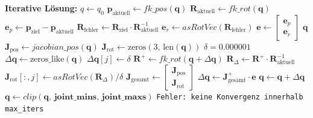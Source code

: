 \begin{algorithm}[H]
\begin{algorithmic}[1]
        \Statex
        \State \textbf{Iterative Lösung:}
        \State $q \gets q_0$ 
            \State $\mathbf{p}_{\text{aktuell}} \gets \mathit{fk\_pos}(\mathbf{q})$
            \State $\mathbf{R}_{\text{aktuell}} \gets \mathit{fk\_rot}(\mathbf{q})$
            \State $\mathbf{e}_p \gets \mathbf{p}_{\text{ziel}} - \mathbf{p}_{\text{aktuell}}$
            \State $\mathbf{R}_{\text{fehler}} \gets \mathbf{R}_{\text{ziel}} \cdot \mathbf{R}_{\text{aktuell}}^{-1}$
            \State $\mathbf{e}_r \gets \mathit{asRotVec}(\mathbf{R}_{\text{fehler}})$
            \State $\mathbf{e} \gets \begin{bmatrix} \mathbf{e}_p \\ \mathbf{e}_r \end{bmatrix}$ 
                \State \Return $\mathbf{q}$
            \EndIf
            \State $\mathbf{J}_{\text{pos}} \gets \mathit{jacobian\_pos}(\mathbf{q})$
            \State $\mathbf{J}_{\text{rot}} \gets \text{zeros}(3,\, \text{len}(\mathbf{q}))$
            \State $\delta = 0.000001$
                \State $\Delta\mathbf{q} \gets \text{zeros\_like}(\mathbf{q})$
                \State $\Delta\mathbf{q}[j] \gets \delta$
                \State $\mathbf{R}^+ \gets \mathit{fk\_rot}(\mathbf{q} + \Delta\mathbf{q})$
                \State $\mathbf{R}_{\Delta} \gets \mathbf{R}^+ \cdot \mathbf{R}_{\text{aktuell}}^{-1}$
                \State $\mathbf{J}_{\text{rot}}[:, j] \gets \mathit{asRotVec}(\mathbf{R}_{\Delta}) / \delta$
            \EndFor
            \State $\mathbf{J}_{\text{gesamt}} \gets \begin{bmatrix} \mathbf{J}_{\text{pos}} \\ \mathbf{J}_{\text{rot}} \end{bmatrix}$
            \State $\Delta\mathbf{q} \gets \mathbf{J}_{\text{gesamt}}^{+} \cdot \mathbf{e}$
            \State $\mathbf{q} \gets \mathbf{q} + \Delta\mathbf{q}$
                \State $\mathbf{q} \gets \mathit{clip}(\mathbf{q},\, \mathbf{joint\_mins},\, \mathbf{joint\_maxs})$
            \EndIf
        \EndFor
        \State \Return \texttt{Fehler: keine Konvergenz innerhalb max\_iters}
    \end{algorithmic}
\end{algorithm}
\vspace{1em}





